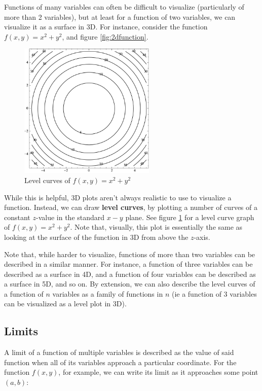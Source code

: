 \documentclass[12pt]{article}
\begin{document}
Functions of many variables can often be difficult to visualize (particularly of more than 2 variables), but at least for a function of two variables, we can visualize it as a surface in 3D. For instance, consider the function $f(x,y) = x^2 + y^2$, and figure \ref{fig:2dfunction}.

\begin{figure}
    \centering
    \includegraphics[width=6.5cm]{misc/levelcurves.png}
    \caption{Level curves of $f(x,y) = x^2 + y^2$}
    \label{fig:levelcurves}
\end{figure}

While this is helpful, 3D plots aren't always realistic to use to visualize a function. Instead, we can draw \textbf{level curves}, by plotting a number of curves of a constant $z$-value in the standard $x-y$ plane. See figure \ref{fig:levelcurves} for a level curve graph of $f(x,y) = x^2 + y^2$. Note that, visually, this plot is essentially the same as looking at the surface of the function in 3D from above the $z$-axis.

Note that, while harder to visualize, functions of more than two variables can be described in a similar manner. For instance, a function of three variables can be described as a surface in 4D, and a function of four variables can be described as a surface in 5D, and so on. By extension, we can also describe the level curves of a function of $n$ variables as a family of functions in $n$ (ie a function of 3 variables can be visualized as a level plot in 3D).

\subsection{Limits}

A limit of a function of multiple variables is described as the value of said function when all of its variables approach a particular coordinate. For the function $f(x,y)$, for example, we can write its limit as it approaches some point $(a,b)$:
\end{document}
